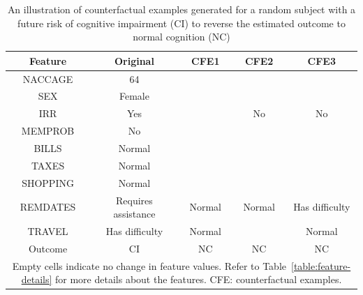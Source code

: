 \begin{table}[H]
    \centering
    \caption{An illustration of counterfactual examples generated for a random subject with a future risk of cognitive impairment (CI) to reverse the estimated outcome to normal cognition (NC)}
    \begin{tabular}{|c|c|c|c|c|}
    \hline
        \textbf{Feature} & \textbf{Original} & \textbf{CFE1} & \textbf{CFE2} & \textbf{CFE3} \\ \hline
        NACCAGE & 64 & ~ & ~ & ~ \\ \hline
        SEX & Female & ~ & ~ & ~ \\ \hline
        IRR & Yes & ~ & No & No \\ \hline
        MEMPROB & No & ~ & ~ & ~ \\ \hline
        BILLS & Normal & ~ & ~ & ~ \\ \hline
        TAXES & Normal & ~ & ~ & ~ \\ \hline
        SHOPPING & Normal & ~ & ~ & ~ \\ \hline
        REMDATES & Requires assistance & Normal & Normal & Has difficulty \\ \hline
        TRAVEL & Has difficulty & Normal & ~ & Normal \\ \hline
        Outcome & CI & NC & NC & NC \\ \hline
    \multicolumn{5}{p{350pt}}{\footnotesize Empty cells indicate no change in feature values. Refer to Table~\ref{table:feature-details} for more details about the features. CFE: counterfactual examples.}
    \end{tabular}
    \label{table:cfe-adni-task3-apdx}
\end{table}

